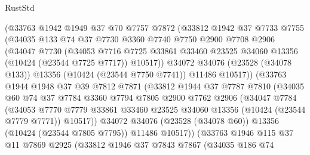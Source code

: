\begin{lexlean}{RustStd}
\begin{coremodule}
            (@33763
              @1942
              @1949
              @37
              @70
              @7757
              @7872
              (@33812
                @1942
                @37
                @7733
                @7755
                (@34035
                  @133
                  @74
                  @37
                  @7730
                  @3360
                  @7740
                  @7750
                  @2900
                  @7708
                  @2906
                  (@34047
                    @7730
                    (@34053
                      @7716
                      @7725
                      @33861
                      @33460
                      @23525
                      @34060
                      @13356
                      (@10424 (@23544 @7725 @7717))
                      @10517))
                  @34072
                  @34076
                  (@23528 (@34078 @133))
                  @13356
                  (@10424 (@23544 @7750 @7741))
                  @11486
                  @10517))
              (@33763
                @1944
                @1948
                @37
                @39
                @7812
                @7871
                (@33812
                  @1944
                  @37
                  @7787
                  @7810
                  (@34035
                    @60
                    @74
                    @37
                    @7784
                    @3360
                    @7794
                    @7805
                    @2900
                    @7762
                    @2906
                    (@34047
                      @7784
                      (@34053
                        @7770
                        @7779
                        @33861
                        @33460
                        @23525
                        @34060
                        @13356
                        (@10424 (@23544 @7779 @7771))
                        @10517))
                    @34072
                    @34076
                    (@23528 (@34078 @60))
                    @13356
                    (@10424 (@23544 @7805 @7795))
                    @11486
                    @10517))
                (@33763
                  @1946
                  @115
                  @37
                  @11
                  @7869
                  @2925
                  (@33812
                    @1946
                    @37
                    @7843
                    @7867
                    (@34035
                      @186
                      @74

\end{coremodule}
\end{lexlean}
